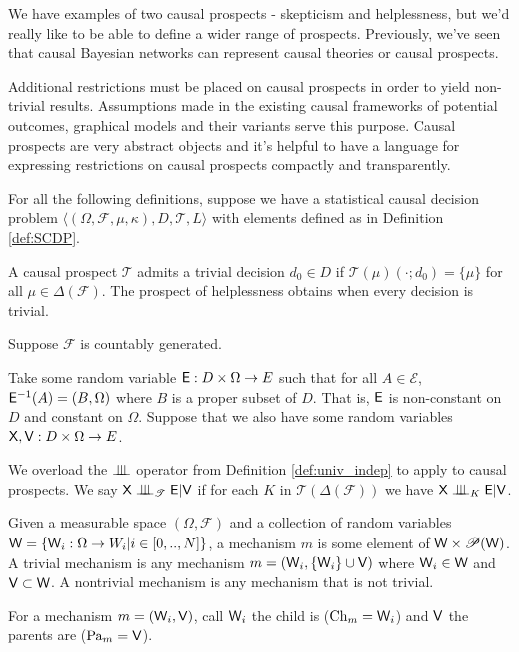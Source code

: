 We have examples of two causal prospects - skepticism and helplessness, but we'd really like to be able to define a wider range of prospects. Previously, we've seen that causal Bayesian networks can represent causal theories or causal prospects. 

Additional restrictions must be placed on causal prospects in order to yield non-trivial results. Assumptions made in the existing causal frameworks of potential outcomes, graphical models and their variants serve this purpose. Causal prospects are very abstract objects and it's helpful to have a language for expressing restrictions on causal prospects compactly and transparently. 

For all the following definitions, suppose we have a statistical causal decision problem $\langle (\Omega,\mathcal{F},\mu,\kappa), D, \mathscr{T}, L\rangle$ with elements defined as in Definition \ref{def:SCDP}.

\begin{definition}
A causal prospect $\mathscr{T}$ admits a trivial decision $d_0\in D$ if $\mathscr{T}(\mu)(\cdot;d_0)=\{\mu\}$ for all $\mu\in \Delta(\mathcal{F})$. The prospect of helplessness obtains when every decision is trivial.
\end{definition}

\begin{definition}
Suppose $\mathcal{F}$ is countably generated.

Take some random variable $\mathsf{E}:D\times \Omega\to E$ such that for all $A\in \mathcal{E}$, $\mathsf{E}^{-1}(A)=(B,\Omega)$ where $B$ is a proper subset of $D$. That is, $\mathsf{E}$ is non-constant on $D$ and constant on $\Omega$. Suppose that we also have some random variables $\mathsf{X},\mathsf{V}:D\times \Omega \to E$.

We overload the $\CII$ operator from Definition \ref{def:univ_indep} to apply to causal prospects. We say $\RV{X}\CII_{\mathscr{T}} \RV{E} | \RV{V}$ if for each $K$ in $\mathscr{T}(\Delta(\mathcal{F}))$ we have $\RV{X}\CII_{K} \RV{E} | \RV{V}$.
\end{definition}

\begin{definition}[Mechanism]
Given a measurable space $(\Omega,\mathcal{F})$ and a collection of random variables $\mathsf{W} = \{\mathsf{W}_i:\Omega\to W_i|i\in [0,..,N]\}$, a mechanism $m$ is some element of $\mathsf{W}\times \mathscr{P}(\mathsf{W})$. A trivial mechanism is any mechanism $m=(\mathsf{W}_i,\{\mathsf{W}_i\}\cup \mathsf{V})$ where $\mathsf{W}_i\in \mathsf{W}$ and $\mathsf{V}\subset\mathsf{W}$. A nontrivial mechanism is any mechanism that is not trivial.

For a mechanism $m=(\mathsf{W}_i,\mathsf{V})$, call $\mathsf{W}_i$ the child is ($\text{Ch}_m=\mathsf{W}_i$) and $\mathsf{V}$ the parents are ($\text{Pa}_m=\mathsf{V}$).
\end{definition}

